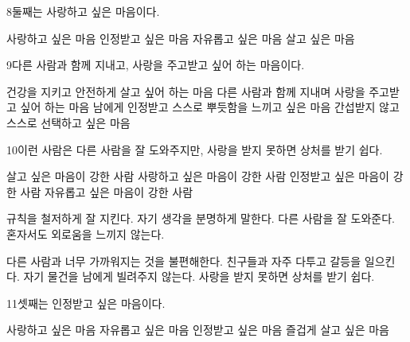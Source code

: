 \documentclass[fs85,seriesRus]{korfarm-base}
\begin{document}
\begin{kfSentenceUnit}{8}{둘째는 사랑하고 싶은 마음이다.}
\begin{kfChoices}
\kfChoice 사랑하고 싶은 마음
\kfChoice 인정받고 싶은 마음
\kfChoice 자유롭고 싶은 마음
\kfChoice 살고 싶은 마음
\end{kfChoices}
\end{kfSentenceUnit}

\begin{kfSentenceUnit}{9}{다른 사람과 함께 지내고, 사랑을 주고받고 싶어 하는 마음이다.}
\begin{kfChoices}
\kfChoice 건강을 지키고 안전하게 살고 싶어 하는 마음
\kfChoice 다른 사람과 함께 지내며 사랑을 주고받고 싶어 하는 마음
\kfChoice 남에게 인정받고 스스로 뿌듯함을 느끼고 싶은 마음
\kfChoice 간섭받지 않고 스스로 선택하고 싶은 마음
\end{kfChoices}
\end{kfSentenceUnit}

\begin{kfSentenceUnit}{10}{이런 사람은 다른 사람을 잘 도와주지만, 사랑을 받지 못하면 상처를 받기 쉽다.}
\begin{kfChoices}
\kfChoice 살고 싶은 마음이 강한 사람
\kfChoice 사랑하고 싶은 마음이 강한 사람
\kfChoice 인정받고 싶은 마음이 강한 사람
\kfChoice 자유롭고 싶은 마음이 강한 사람
\end{kfChoices}
\begin{kfChoices}
\kfChoice 규칙을 철저하게 잘 지킨다.
\kfChoice 자기 생각을 분명하게 말한다.
\kfChoice 다른 사람을 잘 도와준다.
\kfChoice 혼자서도 외로움을 느끼지 않는다.
\end{kfChoices}
\begin{kfChoices}
\kfChoice 다른 사람과 너무 가까워지는 것을 불편해한다.
\kfChoice 친구들과 자주 다투고 갈등을 일으킨다.
\kfChoice 자기 물건을 남에게 빌려주지 않는다.
\kfChoice 사랑을 받지 못하면 상처를 받기 쉽다.
\end{kfChoices}
\end{kfSentenceUnit}

\begin{kfSentenceUnit}{11}{셋째는 인정받고 싶은 마음이다.}
\begin{kfChoices}
\kfChoice 사랑하고 싶은 마음
\kfChoice 자유롭고 싶은 마음
\kfChoice 인정받고 싶은 마음
\kfChoice 즐겁게 살고 싶은 마음
\end{kfChoices}
\end{kfSentenceUnit}
\end{document}
